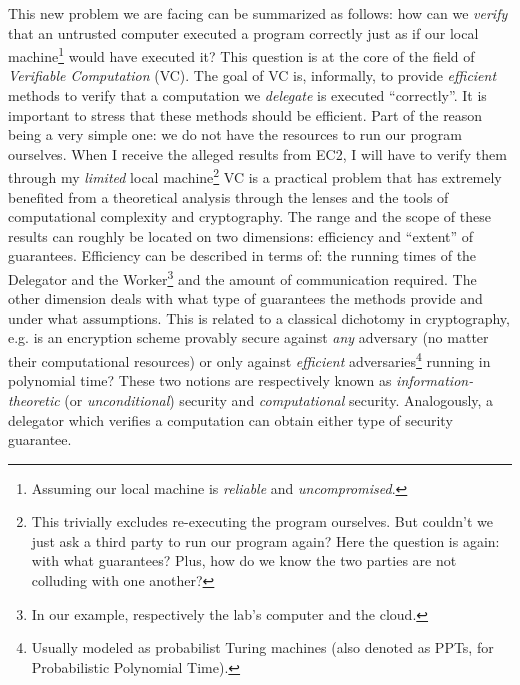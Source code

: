 This new problem we are facing can be summarized as follows: how can we \textit{verify} that an untrusted computer executed a program correctly just as if our local machine\footnote{Assuming our local machine is \textit{reliable} and \textit{uncompromised}.} would have executed it? 
This question is at the core of the field of \textit{Verifiable Computation} (VC). The goal of VC is, informally, to provide \textit{efficient} methods to verify that a computation we \textit{delegate} is executed ``correctly''. It is important to stress that these methods should be efficient. Part of the reason being a very simple one: we do not have the resources to run our program ourselves. When I receive the alleged results from EC2, I will have to verify them through my \textit{limited} local machine\footnote{This trivially excludes re-executing the program ourselves. But couldn't we just ask a third party to run our program again? Here the question is again: with what guarantees? Plus, how do we know the two parties are not colluding with one another?} 
VC is a practical problem that has extremely benefited from a theoretical analysis through the lenses and the tools of computational complexity and cryptography. The range and the scope of these results can roughly be located on two dimensions: efficiency and ``extent'' of guarantees. Efficiency can be described in terms of: the running times of the Delegator and the Worker\footnote{In our example, respectively the lab's computer and the cloud.} and the amount of communication required. The other dimension deals with what type of guarantees the methods provide and under what assumptions. This is related to a classical dichotomy in cryptography, e.g. is an encryption scheme provably secure against \textit{any} adversary (no matter their computational resources) or only against \textit{efficient} adversaries\footnote{Usually modeled as probabilist Turing machines (also denoted as PPTs, for Probabilistic Polynomial Time).} running in polynomial time? These two notions are respectively known as \textit{information-theoretic} (or \textit{unconditional}) security and \textit{computational} security. Analogously, a delegator which verifies a computation can obtain either type of security guarantee. 

